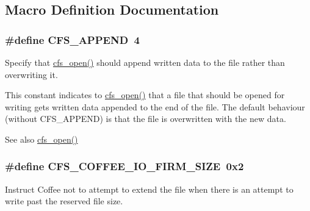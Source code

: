 \subsection{Macro Definition Documentation}
\hypertarget{group__cfs_ga2b402228c26a3590f1d4bf44df0b2b82}{}
\subsubsection[{C\+F\+S\+\_\+\+A\+P\+P\+E\+N\+D}]{\setlength{\rightskip}{0pt plus 5cm}\#define C\+F\+S\+\_\+\+A\+P\+P\+E\+N\+D~4}\label{group__cfs_ga2b402228c26a3590f1d4bf44df0b2b82}
Specify that \hyperlink{group__cfs_gadc1727a1a27a40a8483135425a42c5de}{cfs\+\_\+open()} should append written data to the file rather than overwriting it.

This constant indicates to \hyperlink{group__cfs_gadc1727a1a27a40a8483135425a42c5de}{cfs\+\_\+open()} that a file that should be opened for writing gets written data appended to the end of the file. The default behaviour (without C\+F\+S\+\_\+\+A\+P\+P\+E\+N\+D) is that the file is overwritten with the new data.

\begin{DoxySeeAlso}{See also}
\hyperlink{group__cfs_gadc1727a1a27a40a8483135425a42c5de}{cfs\+\_\+open()} 
\end{DoxySeeAlso}
\hypertarget{group__cfs_ga6f4139866092ae209517c8b9e8c740c1}{}
\subsubsection[{C\+F\+S\+\_\+\+C\+O\+F\+F\+E\+E\+\_\+\+I\+O\+\_\+\+F\+I\+R\+M\+\_\+\+S\+I\+Z\+E}]{\setlength{\rightskip}{0pt plus 5cm}\#define C\+F\+S\+\_\+\+C\+O\+F\+F\+E\+E\+\_\+\+I\+O\+\_\+\+F\+I\+R\+M\+\_\+\+S\+I\+Z\+E~0x2}\label{group__cfs_ga6f4139866092ae209517c8b9e8c740c1}
Instruct Coffee not to attempt to extend the file when there is an attempt to write past the reserved file size.

